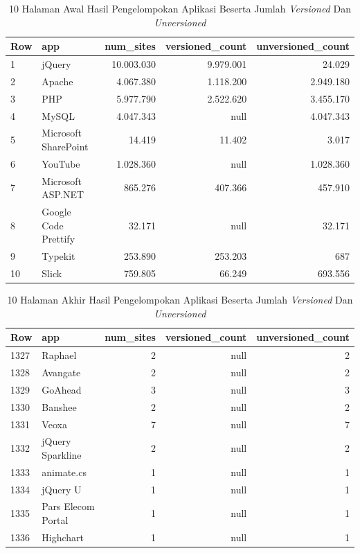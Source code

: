 \begin{table}[H]
	\centering
	\begin{tabular}{|l|l|r|r|r|}
		\hline
		\textbf{Row} & \textbf{app} & \textbf{num\_sites} & \textbf{versioned\_count} & \textbf{unversioned\_count}\\
		\hline
		1 & jQuery & 10.003.030 & 9.979.001 & 24.029\\
		\hline
		2 & Apache & 4.067.380 & 1.118.200 & 2.949.180\\
		\hline
		3 & PHP & 5.977.790 & 2.522.620 & 3.455.170\\
		\hline
		4 & MySQL & 4.047.343 & null & 4.047.343\\
		\hline
		5 & Microsoft SharePoint & 14.419 & 11.402 & 3.017\\
		\hline
		6 & YouTube & 1.028.360& null & 1.028.360\\
		\hline
		7 & Microsoft ASP.NET & 865.276 & 407.366 & 457.910\\
		\hline
		8 & Google Code Prettify & 32.171 & null & 32.171\\
		\hline
		9 & Typekit & 253.890 & 253.203 & 687\\
		\hline
		10 & Slick & 759.805 & 66.249 & 693.556\\
		\hline
	\end{tabular}
	\caption{10 Halaman Awal Hasil Pengelompokan Aplikasi Beserta Jumlah \textit{Versioned} Dan \textit{Unversioned}}
	\label{table:contoh_langkah431}
\end{table}

\begin{table}[H]
	\centering
	\begin{tabular}{|l|l|r|r|r|}
		\hline
		\textbf{Row} & \textbf{app} & \textbf{num\_sites} & \textbf{versioned\_count} & \textbf{unversioned\_count}\\
		\hline
		1327 & Raphael & 2 & null & 2\\
		\hline
		1328 & Avangate & 2 & null & 2\\
		\hline
		1329 & GoAhead
		 & 3 & null & 3\\
		\hline
		1330 & Banshee & 2 & null & 2\\
		\hline
		1331 & Veoxa & 7 & null & 7\\
		\hline
		1332 & jQuery Sparkline
		 & 2& null & 2\\
		\hline
		1333 &animate.cs
		 & 1 & null & 1\\
		\hline
		1334 & jQuery U
		 & 1 & null & 1\\
		\hline
		1335 & Pars Elecom Portal
		 & 1 & null & 1\\
		\hline
		1336 & Highchart
		 & 1 & null & 1\\
		\hline
	\end{tabular}
	\caption{10 Halaman Akhir Hasil Pengelompokan Aplikasi Beserta Jumlah \textit{Versioned} Dan \textit{Unversioned}}
	\label{table:contoh_langkah432}
\end{table}

